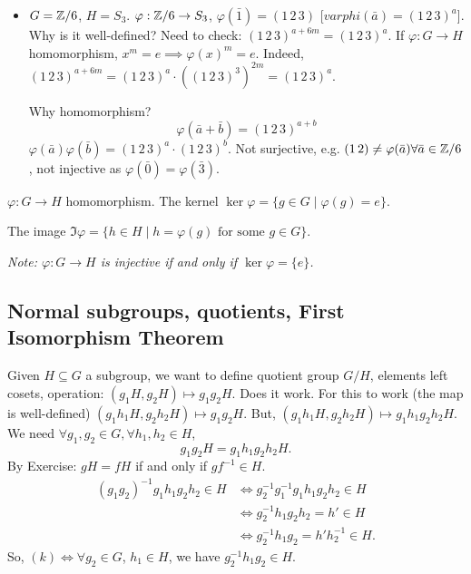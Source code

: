 \documentclass[10pt, a4paper]{article}
\begin{document}
\begin{example}
\begin{itemize}
        \item $G = \mathbb{Z} / 6$,
        $H = S_3$.
        $\varphi : \mathbb{Z} / 6  \to S_3$,
        $\varphi(\bar{1}) = (1\,2\,3)$
        [$varphi(\bar{a}) = (1\,2\,3) ^ a$].
        Why is it well-defined?
        Need to check:
        $(1\,2\,3) ^ {a + 6m} = (1\,2\,3) ^ a$.
        If $\varphi : G \to H$ homomorphism,
        $x ^ m = e \implies \varphi(x) ^ m = e$.
        Indeed,
        $(1\,2\,3) ^ {a + 6m} = (1\,2\,3) ^ a \cdot ((1\,2\,3) ^ 3) ^ {2m} = (1\,2\,3) ^ a$.

        Why homomorphism?
        \[
        \varphi(\bar{a} + \bar{b}) = (1\,2\,3) ^ {a + b}
        \]
        $\varphi(\bar{a})\varphi(\bar{b}) = (1\,2\,3) ^ a\cdot(1\,2\,3) ^ b$.
        Not surjective,
        e.g. $(1\,2) \neq \varphi(\bar{a}) \forall \bar{a} \in \mathbb{Z} / 6$,
        not injective as $\varphi(\bar{0}) = \varphi(\bar{3})$.
    \end{itemize}
\end{example}

\begin{definition}
    $\varphi : G \to H$ homomorphism.
    The kernel $\ker{\varphi} = \{g \in G \mid \varphi(g) = e\}$.
    
    The image $\Im{\varphi} = \{h \in H \mid h = \varphi(g)\text{ for some $g \in G$}\}$.
\end{definition}

\textit{Note:
$\varphi : G \to H$ is injective if and only if $\ker{\varphi} = \{e\}$.}

\subsection{Normal subgroups,
quotients,
First Isomorphism Theorem}

Given $H \subseteq G$ a subgroup,
we want to define quotient group $G / H$,
elements left cosets,
operation:
$(g_1H, g_2H) \mapsto g_1g_2H$.
Does it work.
For this to work
(the map is well-defined)
$(g_1h_1H, g_2h_2H) \mapsto g_1g_2H$.
But,
$(g_1h_1H, g_2h_2H) \mapsto g_1h_1g_2h_2H$.
We need $\forall g_1, g_2 \in G, \forall h_1, h_2 \in H$,
\[
g_1g_2H = g_1h_1g_2h_2H.
\]
By Exercise:
$gH = fH$ if and only if $gf ^ {-1} \in H$.
\begin{align*}
    (g_1g_2) ^ {-1}g_1h_1g_2h_2 \in H &\iff  g_2 ^ {-1}g_1 ^ {-1}g_1h_1g_2h_2 \in H \\
    &\iff g_2 ^ {-1}h_1g_2h_2 = h' \in H \\
    &\iff g_2 ^ {-1}h_1g_2 = h'h_2 ^ {-1} \in H.
\end{align*}
So,
$(k) \iff \forall g_2 \in G$,
$h_1 \in H$,
we have $g_2 ^ {-1}h_1g_2 \in H$.
\end{document}
